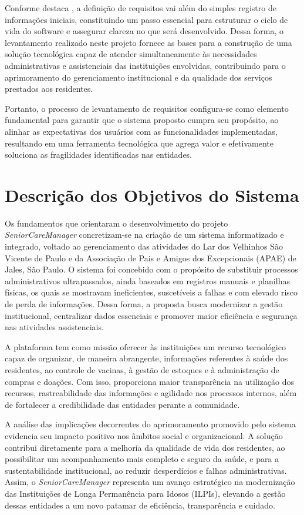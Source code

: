 Conforme destaca \textcite{Sommerville2018ES10}, a definição de requisitos vai além do simples registro de informações iniciais, constituindo um passo essencial para estruturar o ciclo de vida do software e assegurar clareza no que será desenvolvido. Dessa forma, o levantamento realizado neste projeto fornece as bases para a construção de uma solução tecnológica capaz de atender simultaneamente às necessidades administrativas e assistenciais das instituições envolvidas, contribuindo para o aprimoramento do gerenciamento institucional e da qualidade dos serviços prestados aos residentes.  

Portanto, o processo de levantamento de requisitos configura-se como elemento fundamental para garantir que o sistema proposto cumpra seu propósito, ao alinhar as expectativas dos usuários com as funcionalidades implementadas, resultando em uma ferramenta tecnológica que agrega valor e efetivamente soluciona as fragilidades identificadas nas entidades.

\section{Descrição dos Objetivos do Sistema}

Os fundamentos que orientaram o desenvolvimento do projeto \textit{SeniorCareManager} concretizam-se na criação de um sistema informatizado e integrado, voltado ao gerenciamento das atividades do Lar dos Velhinhos São Vicente de Paulo e da Associação de Pais e Amigos dos Excepcionais (APAE) de Jales, São Paulo. O sistema foi concebido com o propósito de substituir processos administrativos ultrapassados, ainda baseados em registros manuais e planilhas físicas, os quais se mostravam ineficientes, suscetíveis a falhas e com elevado risco de perda de informações. Dessa forma, a proposta busca modernizar a gestão institucional, centralizar dados essenciais e promover maior eficiência e segurança nas atividades assistenciais.

A plataforma tem como missão oferecer às instituições um recurso tecnológico capaz de organizar, de maneira abrangente, informações referentes à saúde dos residentes, ao controle de vacinas, à gestão de estoques e à administração de compras e doações. Com isso, proporciona maior transparência na utilização dos recursos, rastreabilidade das informações e agilidade nos processos internos, além de fortalecer a credibilidade das entidades perante a comunidade.

A análise das implicações decorrentes do aprimoramento promovido pelo sistema evidencia seu impacto positivo nos âmbitos social e organizacional. A solução contribui diretamente para a melhoria da qualidade de vida dos residentes, ao possibilitar um acompanhamento mais completo e seguro da saúde, e para a sustentabilidade institucional, ao reduzir desperdícios e falhas administrativas. Assim, o \textit{SeniorCareManager} representa um avanço estratégico na modernização das Instituições de Longa Permanência para Idosos (ILPIs), elevando a gestão dessas entidades a um novo patamar de eficiência, transparência e cuidado.

